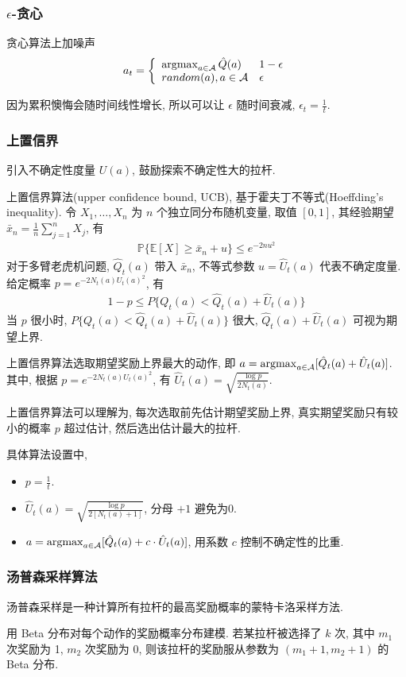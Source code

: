 \subsubsection{\texorpdfstring{$\epsilon$}.-贪心 }
贪心算法上加噪声
\begin{align*}
    a_t=\left\{ \begin{array}{ll}
        \operatorname*{argmax}_{a\in \mathcal{A}} \hat{Q}(a) & 1-\epsilon\\
        random(a), a\in \mathcal{A} & \epsilon
    \end{array} \right.
\end{align*}

因为累积懊悔会随时间线性增长, 所以可以让 $\epsilon$ 随时间衰减, $\epsilon_t=\frac{1}{t}$.

\subsubsection{上置信界}

引入不确定性度量 $U(a)$, 鼓励探索不确定性大的拉杆. 

上置信界算法(upper confidence bound, UCB), 基于霍夫丁不等式(Hoeffding's inequality). 令 $X_1, \dots, X_n$ 为 $n$ 个独立同分布随机变量, 取值 $[0,1]$, 其经验期望 $\bar{x}_n=\frac{1}{n}\sum_{j=1}^nX_j$, 有
\begin{align*}
    \mathbb{P}\{ \mathbb{E}[X]\ge \bar{x}_n + u \}\le e^{-2nu^2}
\end{align*}
对于多臂老虎机问题, $\hat{Q}_t(a)$ 带入 $\bar{x}_n$, 不等式参数 $u=\hat{U}_t(a)$ 代表不确定度量. 给定概率 $p=e^{-2N_t(a)U_t(a)^2}$, 有
\begin{align*}
    1-p\le P\{Q_t(a)< \hat{Q}_t(a)+\hat{U}_t(a)\}
\end{align*}
当 $p$ 很小时, $P\{Q_t(a)< \hat{Q}_t(a)+\hat{U}_t(a)\}$ 很大, $\hat{Q}_t(a)+\hat{U}_t(a)$ 可视为期望上界. 

上置信界算法选取期望奖励上界最大的动作, 即 $a=\operatorname*{argmax}_{a\in\mathcal{A}} [\hat{Q}_t(a)+\hat{U}_t(a)]$. 其中, 根据 $p=e^{-2N_t(a)U_t(a)^2}$, 有 $\hat{U}_t(a)=\sqrt{\frac{\log p}{2N_t(a)}}$. 

上置信界算法可以理解为, 每次选取前先估计期望奖励上界, 真实期望奖励只有较小的概率 $p$ 超过估计, 然后选出估计最大的拉杆. 

具体算法设置中, 
\begin{itemize}
    \item $p=\frac{1}{t}$.
    \item $\hat{U}_t(a)=\sqrt{\frac{\log p}{2[N_t(a)+1]}}$, 分母 $+1$ 避免为0. 
    \item $a=\operatorname*{argmax}_{a\in\mathcal{A}} [\hat{Q}_t(a)+c\cdot\hat{U}_t(a)]$, 用系数 $c$ 控制不确定性的比重. 
\end{itemize}

\subsubsection{汤普森采样算法}
汤普森采样是一种计算所有拉杆的最高奖励概率的蒙特卡洛采样方法.

用 Beta 分布对每个动作的奖励概率分布建模. 若某拉杆被选择了 $k$ 次, 其中 $m_1$ 次奖励为 1, $m_2$ 次奖励为 0, 则该拉杆的奖励服从参数为 $(m_1+1, m_2+1)$ 的 Beta 分布.

